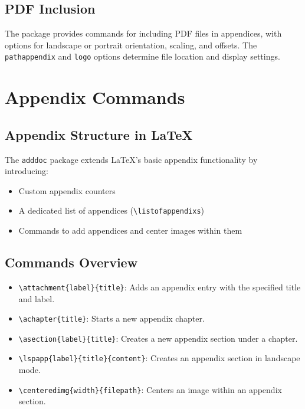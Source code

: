 \documentclass[12pt,twoside]{report}
\begin{document}
\section{PDF Inclusion}
The package provides commands for including PDF files in appendices, with options for landscape or portrait orientation, scaling, and offsets. The \texttt{pathappendix} and \texttt{logo} options determine file location and display settings.

\chapter{Appendix Commands}

\section{Appendix Structure in LaTeX}
The \texttt{adddoc} package extends LaTeX's basic appendix functionality by introducing:
\begin{itemize}
    \item Custom appendix counters
    \item A dedicated list of appendices (\texttt{\textbackslash listofappendixs})
    \item Commands to add appendices and center images within them
\end{itemize}

\section{Commands Overview}
\begin{itemize}
    \item \verb|\attachment{label}{title}|: Adds an appendix entry with the specified title and label.
    \item \verb|\achapter{title}|: Starts a new appendix chapter.
    \item \verb|\asection{label}{title}|: Creates a new appendix section under a chapter.
    \item \verb|\lspapp{label}{title}{content}|: Creates an appendix section in landscape mode.
    \item \verb|\centeredimg{width}{filepath}|: Centers an image within an appendix section.
    
\end{itemize}
\end{document}
